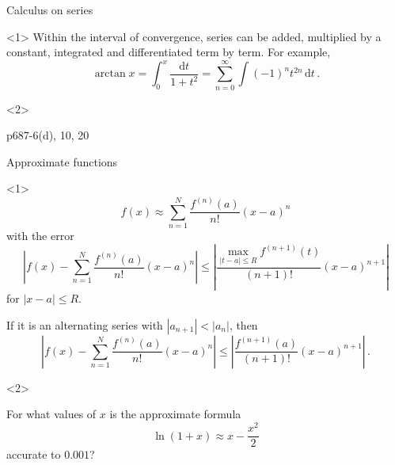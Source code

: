 \begin{frame}{Calculus on series}

\begin{onlyenv}<1>
Within the interval of convergence, series can be added, multiplied
by a constant, integrated and differentiated \alert{term by term}.
For example,
\[
\arctan x=\int_{0}^{x}\frac{\mathrm{d}t}{1+t^{2}}=\sum_{n=0}^{\infty}\int\left(-1\right)^{n}t^{2n}\,\mathrm{d}t\,.
\]
\end{onlyenv}

\begin{onlyenv}<2>

\begin{example}
    p687-6(d), 10, 20
\end{example}

\end{onlyenv}

\end{frame}

\begin{frame}{Approximate functions}

\begin{onlyenv}<1>
\[
f\left(x\right)\approx\sum_{n=1}^{N}\frac{f^{\left(n\right)}\left(a\right)}{n!}\left(x-a\right)^{n}
\]
with the error
\[
\left|f\left(x\right)-\sum_{n=1}^{N}\frac{f^{\left(n\right)}\left(a\right)}{n!}\left(x-a\right)^{n}\right|\le\left|\frac{{\displaystyle \max_{\left|t-a\right|\le R}}f^{\left(n+1\right)}\left(t\right)}{\left(n+1\right)!}\left(x-a\right)^{n+1}\right|
\]
for $\left|x-a\right|\le R$.

If it is an alternating series with $\left|a_{n+1}\right|<\left|a_{n}\right|$,
then
\[
\left|f\left(x\right)-\sum_{n=1}^{N}\frac{f^{\left(n\right)}\left(a\right)}{n!}\left(x-a\right)^{n}\right|\le\left|\frac{f^{\left(n+1\right)}\left(a\right)}{\left(n+1\right)!}\left(x-a\right)^{n+1}\right|\,.
\]
\end{onlyenv}

\begin{onlyenv}<2>

\begin{example}
For what values of $x$ is the approximate formula
\[
\ln\left(1+x\right)\approx x-\frac{x^{2}}{2}
\]
accurate to $0.001$?\end{example}

\end{onlyenv}

\end{frame}


